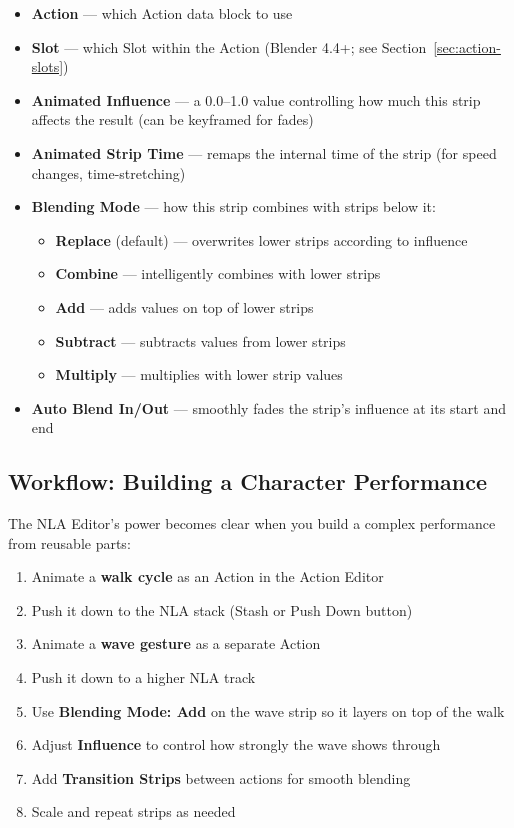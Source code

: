 \begin{itemize}[leftmargin=2em]
  \item \textbf{Action} --- which Action data block to use
  \item \textbf{Slot} --- which Slot within the Action (Blender 4.4+; see Section~\ref{sec:action-slots})
  \item \textbf{Animated Influence} --- a 0.0--1.0 value controlling how much this strip affects the result (can be keyframed for fades)
  \item \textbf{Animated Strip Time} --- remaps the internal time of the strip (for speed changes, time-stretching)
  \item \textbf{Blending Mode} --- how this strip combines with strips below it:
  \begin{itemize}[leftmargin=1.5em]
    \item \textbf{Replace} (default) --- overwrites lower strips according to influence
    \item \textbf{Combine} --- intelligently combines with lower strips
    \item \textbf{Add} --- adds values on top of lower strips
    \item \textbf{Subtract} --- subtracts values from lower strips
    \item \textbf{Multiply} --- multiplies with lower strip values
  \end{itemize}
  \item \textbf{Auto Blend In/Out} --- smoothly fades the strip's influence at its start and end
\end{itemize}

\subsection{Workflow: Building a Character Performance}

The NLA Editor's power becomes clear when you build a complex performance from reusable parts:

\begin{enumerate}[leftmargin=2em]
  \item Animate a \textbf{walk cycle} as an Action in the Action Editor
  \item Push it down to the NLA stack (Stash or Push Down button)
  \item Animate a \textbf{wave gesture} as a separate Action
  \item Push it down to a higher NLA track
  \item Use \textbf{Blending Mode: Add} on the wave strip so it layers on top of the walk
  \item Adjust \textbf{Influence} to control how strongly the wave shows through
  \item Add \textbf{Transition Strips} between actions for smooth blending
  \item Scale and repeat strips as needed
\end{enumerate}

